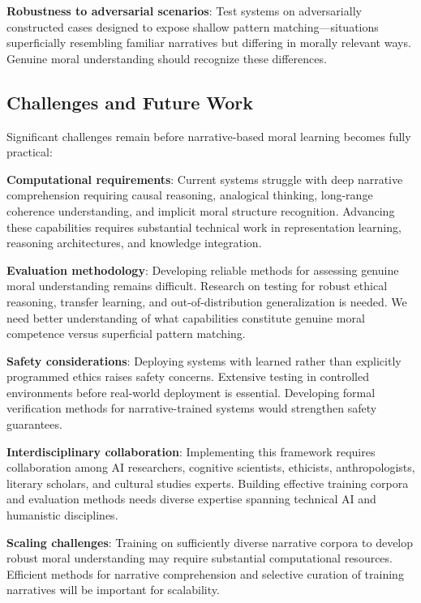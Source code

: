 \documentclass[12pt]{article}
\begin{document}
\textbf{Robustness to adversarial scenarios}: Test systems on adversarially constructed cases designed to expose shallow pattern matching---situations superficially resembling familiar narratives but differing in morally relevant ways. Genuine moral understanding should recognize these differences.

\subsection{Challenges and Future Work}

Significant challenges remain before narrative-based moral learning becomes fully practical:

\textbf{Computational requirements}: Current systems struggle with deep narrative comprehension requiring causal reasoning, analogical thinking, long-range coherence understanding, and implicit moral structure recognition. Advancing these capabilities requires substantial technical work in representation learning, reasoning architectures, and knowledge integration.

\textbf{Evaluation methodology}: Developing reliable methods for assessing genuine moral understanding remains difficult. Research on testing for robust ethical reasoning, transfer learning, and out-of-distribution generalization is needed. We need better understanding of what capabilities constitute genuine moral competence versus superficial pattern matching.

\textbf{Safety considerations}: Deploying systems with learned rather than explicitly programmed ethics raises safety concerns. Extensive testing in controlled environments before real-world deployment is essential. Developing formal verification methods for narrative-trained systems would strengthen safety guarantees.

\textbf{Interdisciplinary collaboration}: Implementing this framework requires collaboration among AI researchers, cognitive scientists, ethicists, anthropologists, literary scholars, and cultural studies experts. Building effective training corpora and evaluation methods needs diverse expertise spanning technical AI and humanistic disciplines.

\textbf{Scaling challenges}: Training on sufficiently diverse narrative corpora to develop robust moral understanding may require substantial computational resources. Efficient methods for narrative comprehension and selective curation of training narratives will be important for scalability.
\end{document}
